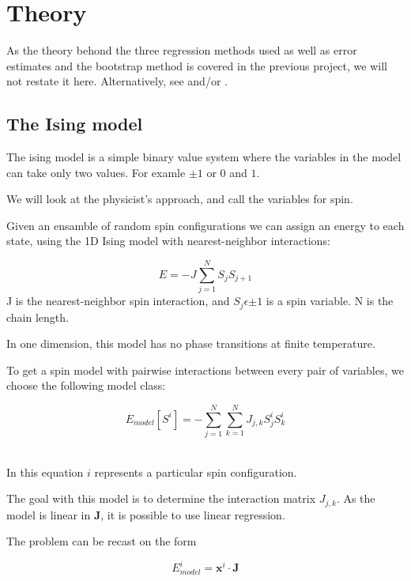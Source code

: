 \section{Theory}

As the theory behond the three regression methods used as well as error 
estimates and the bootstrap method is covered in the previous 
project, we will not restate it here.
Alternatively, see \cite{HighBias} and/or \cite{LectureNotes-FysStk}.

\subsection{The Ising model}\label{seq:isingtheory}
The ising model is a simple binary value system where the variables
in the model can take only two values. For examle \(\pm 1\) or \(0\) and \(1\). 
~\cite{Project2} 

We will look at the physicist's approach, and call the variables for spin.
~\cite{Project2}

Given an ensamble of random spin configurations we can assign an energy to
each state, using the 1D Ising model with nearest-neighbor interactions: 

\begin{equation}
	E = -J\sum\limits_{j=1}^N S_jS_{j+1} 
\end{equation}
J is the nearest-neighbor spin interaction, and \(S_j \epsilon {\pm 1}\) is a 
spin variable. N is the chain length. 
~\cite{HighBias}~\cite{Project2} 

In one dimension, this model has no phase transitions at finite temperature.
~\cite{Project2} 

To get a spin model with pairwise interactions between every pair of variables,
we choose the following model class: 

\begin{equation}
	E_{model}[S^i] = -\sum\limits_{j=1}^N\sum\limits_{k=1}^N J_{j,k} S_j^iS_{k}^i
\end{equation}
~\cite{HighBias} 

In this equation \(i\) represents a particular spin configuration. ~\cite{Project2}

The goal with this model is to determine the interaction matrix \(J_{j,k}\). 
As the model is linear in \(\mathbf{J}\), it is possible to use
linear regression.  

The problem can be recast on the form

\begin{equation}
	E_{model}^i = \mathbf{x}^i \cdot \mathbf{J}  
\end{equation}

